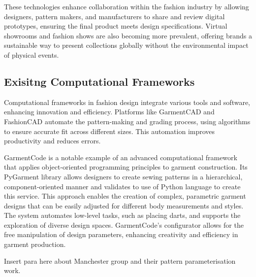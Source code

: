 These technologies enhance collaboration within the fashion industry by allowing designers, pattern makers, and manufacturers to share and review digital prototypes, ensuring the final product meets design specifications. Virtual showrooms and fashion shows are also becoming more prevalent, offering brands a sustainable way to present collections globally without the environmental impact of physical events.

\subsection{Exisitng Computational Frameworks}
Computational frameworks in fashion design integrate various tools and software, enhancing innovation and efficiency. Platforms like GarmentCAD and FashionCAD automate the pattern-making and grading process, using algorithms to ensure accurate fit across different sizes. This automation improves productivity and reduces errors.

GarmentCode is a notable example of an advanced computational framework that applies object-oriented programming principles to garment construction. Its PyGarment library allows designers to create sewing patterns in a hierarchical, component-oriented manner and validates to use of Python language to create this service. This approach enables the creation of complex, parametric garment designs that can be easily adjusted for different body measurements and styles. The system automates low-level tasks, such as placing darts, and supports the exploration of diverse design spaces. GarmentCode's configurator allows for the free manipulation of design parameters, enhancing creativity and efficiency in garment production.

Insert para here about Manchester group and their pattern parameterisation work.


